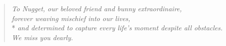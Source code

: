 \phantom{.}
\vspace{4in}

\begin{singlespace}
\begin{quote}
  \textit{To Nugget, our beloved friend and bunny extraordinaire,}\\
  \textit{forever weaving mischief into our lives,}\\*
  \textit{and determined to capture every life's moment despite all obstacles.}\\
  \textit{We miss you dearly.}
\end{quote}
\end{singlespace}

%
